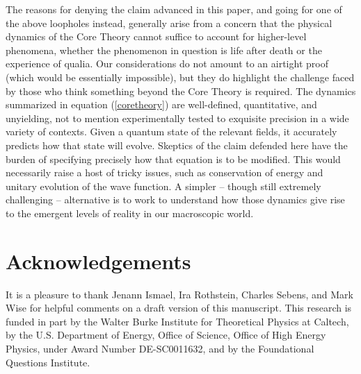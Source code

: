 \documentclass[12pt,letterpaper]{article}
\begin{document}
The reasons for denying the claim advanced in this paper, and going for one of the above loopholes instead, generally arise from a concern that the physical dynamics of the Core Theory cannot suffice to account for higher-level phenomena, whether the phenomenon in question is life after death or the experience of qualia.
Our considerations do not amount to an airtight proof (which would be essentially impossible), but they do highlight the challenge faced by those who think something beyond the Core Theory is required.
The dynamics summarized in equation (\ref{coretheory}) are well-defined, quantitative, and unyielding, not to mention experimentally tested to exquisite precision in a wide variety of contexts.
Given a quantum state of the relevant fields, it accurately predicts how that state will evolve.
Skeptics of the claim defended here have the burden of specifying precisely how that equation is to be modified.
This would necessarily raise a host of tricky issues, such as conservation of energy and unitary evolution of the wave function.
A simpler -- though still extremely challenging -- alternative is to work to understand how those dynamics give rise to the emergent levels of reality in our macroscopic world.



\section*{Acknowledgements}
 
It is a pleasure to thank Jenann Ismael, Ira Rothstein, Charles Sebens, and Mark Wise for helpful comments on a draft version of this manuscript.
This research is funded in part by the Walter Burke Institute for Theoretical Physics at Caltech, by the U.S. Department of Energy, Office of Science, Office of High Energy Physics, under Award Number DE-SC0011632, and by the Foundational Questions Institute.





\end{document}
